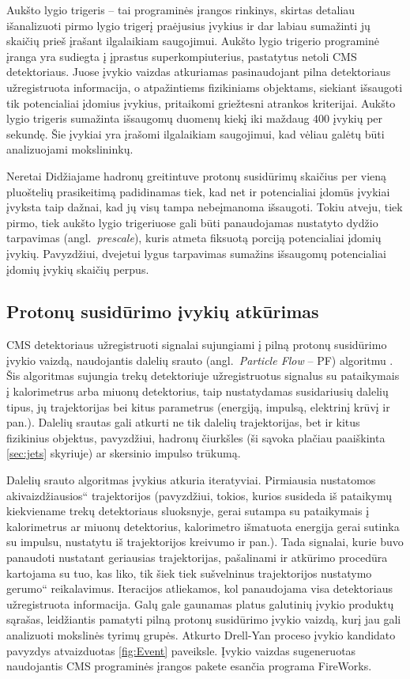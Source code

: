 \documentclass[a4paper, 12pt, oneside]{article}
\newcommand{\ltq}[1]{{\quotedblbase{}#1\textquotedblleft{}}}
\newlength\q
\begin{document}
Aukšto lygio trigeris -- tai programinės įrangos rinkinys, skirtas detaliau išanalizuoti pirmo lygio trigerį praėjusius
įvykius ir dar labiau sumažinti jų skaičių prieš įrašant ilgalaikiam saugojimui.
Aukšto lygio trigerio programinė įranga yra sudiegta į įprastus superkompiuterius, pastatytus netoli CMS detektoriaus.
Juose įvykio vaizdas atkuriamas pasinaudojant pilna detektoriaus užregistruota informacija, o atpažintiems fizikiniams
objektams, siekiant išsaugoti tik potencialiai įdomius įvykius, pritaikomi griežtesni atrankos kriterijai.
Aukšto lygio trigeris sumažinta išsaugomų duomenų kiekį iki maždaug $400$ įvykių per sekundę.
Šie įvykiai yra įrašomi ilgalaikiam saugojimui, kad vėliau galėtų būti analizuojami mokslininkų.

Neretai Didžiajame hadronų greitintuve protonų susidūrimų skaičius per vieną pluoštelių prasikeitimą padidinamas tiek,
kad net ir potencialiai įdomūs įvykiai įvyksta taip dažnai, kad jų visų tampa nebeįmanoma išsaugoti.
Tokiu atveju, tiek pirmo, tiek aukšto lygio trigeriuose gali būti panaudojamas nustatyto dydžio tarpavimas (angl.\ \textit{prescale}),
kuris atmeta fiksuotą porciją potencialiai įdomių įvykių.
Pavyzdžiui, dvejetui lygus tarpavimas sumažins išsaugomų potencialiai įdomių įvykių skaičių perpus.


\subsection{Protonų susidūrimo įvykių atkūrimas}
CMS detektoriaus užregistruoti signalai sujungiami į pilną protonų susidūrimo įvykio vaizdą, naudojantis
dalelių srauto (angl.\ \textit{Particle Flow} -- PF) algoritmu \cite{ParticleFlow}.
Šis algoritmas sujungia trekų detektoriuje užregistruotus signalus su pataikymais į kalorimetrus arba miuonų
detektorius, taip nustatydamas susidariusių dalelių tipus, jų trajektorijas bei kitus parametrus
(energiją, impulsą, elektrinį krūvį ir pan.).
Dalelių srautas gali atkurti ne tik dalelių trajektorijas, bet ir kitus fizikinius objektus, pavyzdžiui,
hadronų čiurkšles (ši sąvoka plačiau paaiškinta \ref{sec:jets} skyriuje) ar skersinio impulso trūkumą.

Dalelių srauto algoritmas įvykius atkuria iteratyviai.
Pirmiausia nustatomos \ltq{akivaizdžiausios} trajektorijos (pavyzdžiui, tokios, kurios susideda iš pataikymų
kiekviename trekų detektoriaus sluoksnyje, gerai sutampa su pataikymais į kalorimetrus ar miuonų detektorius,
kalorimetro išmatuota energija gerai sutinka su impulsu, nustatytu iš trajektorijos kreivumo ir pan.).
Tada signalai, kurie buvo panaudoti nustatant geriausias trajektorijas, pašalinami ir atkūrimo procedūra
kartojama su tuo, kas liko, tik šiek tiek sušvelninus trajektorijos nustatymo \ltq{gerumo} reikalavimus.
Iteracijos atliekamos, kol panaudojama visa detektoriaus užregistruota informacija.
Galų gale gaunamas platus galutinių įvykio produktų sąrašas, leidžiantis pamatyti pilną protonų susidūrimo įvykio vaizdą,
kurį jau gali analizuoti mokslinės tyrimų grupės.
Atkurto Drell-Yan proceso įvykio kandidato pavyzdys atvaizduotas \ref{fig:Event} paveiksle.
Įvykio vaizdas sugeneruotas naudojantis CMS programinės įrangos pakete esančia programa FireWorks.
\end{document}
